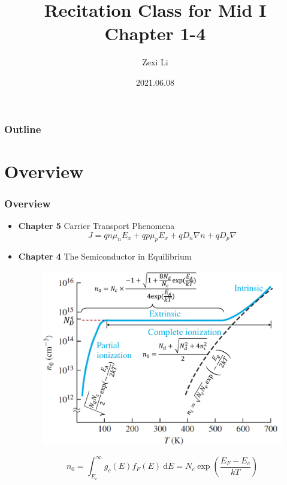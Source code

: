 \documentclass{beamer}
\begin{document}
\renewcommand{\d}{\: \mathrm{d} }
\newcommand{\e}{\mathrm{e}}


\title[] {Recitation Class for Mid I \\ Chapter 1-4}

\author[lzx]{Zexi Li}


\date{2021.06.08}

\frame{\titlepage}


\begin{frame}
    \frametitle{Outline}
    \tableofcontents
\end{frame}


\section{Overview}
    \begin{frame} \frametitle{Overview}
        \begin{itemize}
            \item \textbf{Chapter 5} Carrier Transport Phenomena
                \begin{equation*}
                    J = qn\mu_n E_x+ qp\mu_p E_x + qD_n \nabla n + q D_p \nabla
                \end{equation*}
            \item \textbf{Chapter 4} The Semiconductor in Equilibrium
                \begin{figure}[H]
                    \centering
                    \includegraphics[width=0.6\linewidth]{Ionization-of-dopants.jpg}
                    \label{fig:Ionization-of-dopants.jpg}
                \end{figure}
                \begin{equation*}
                    n_0 = \int_{E_c}^\infty g_c(E) f_F(E) \d E = N_c \exp\left( \frac{E_F - E_c}{kT}  \right)
                \end{equation*}
        \end{itemize}
    \end{frame}
\end{document}
